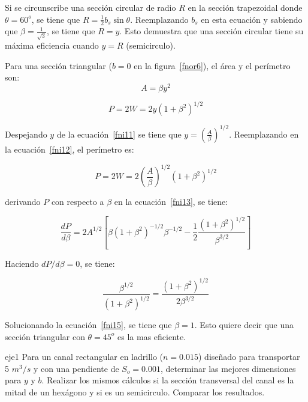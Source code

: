 \documentclass[11pt, oneside]{article}
\begin{document}
Si se circunscribe una secci\'on circular de radio $R$ en la secci\'on trapezoidal donde $\theta=60^o$, se tiene que $R=\frac{1}{2}b_s \sin \theta$. Reemplazando $b_s$ en esta ecuaci\'on y sabiendo que $\beta=\frac{1}{\sqrt{3}}$, se tiene que $R=y$. Esto demuestra que una secci\'on circular tiene su m\'axima eficiencia cuando $y=R$ (semicirculo). 

Para una secci\'on triangular ($b=0$ en la figura~\ref{fnor6}), el \'area y el per\'imetro son:
\begin{equation}
A = \beta y^2
\label{fni11}
\end{equation}

\begin{equation}
P = 2W =  2y \left( 1+\beta^2 \right)^{1/2}
\label{fni12}
\end{equation}

Despejando $y$ de la ecuaci\'on~\ref{fni11} se tiene que $y = \left( \frac{A}{\beta} \right)^{1/2}$. Reemplazando en la ecuaci\'on~\ref{fni12}, el per\'imetro es:

\begin{equation}
P = 2W =  2\left(\frac{A}{\beta}\right)^{1/2} \left( 1+\beta^2 \right)^{1/2}
\label{fni13}
\end{equation}

derivando $P$ con respecto a $\beta$ en la ecuaci\'on~\ref{fni13}, se tiene:

\begin{equation}
\frac{dP}{d\beta} =2A^{1/2}\left[ \beta \left( 1+\beta^2 \right)^{-1/2} \beta^{-1/2} - \frac{1}{2} \frac{\left( 1+\beta^2 \right)^{1/2}}{\beta^{3/2}} \right]
\label{fni14}
\end{equation}

Haciendo $dP/d\beta = 0$, se tiene:

\begin{equation}
\frac{\beta^{1/2}}{\left( 1+\beta^2 \right)^{1/2}} = \frac{\left( 1+\beta^2 \right)^{1/2}}{2 \beta^{3/2}}
\label{fni15}
\end{equation}

Solucionando la ecuaci\'on~\ref{fni15}, se tiene que $\beta=1$. Esto quiere decir que una secci\'on triangular con $\theta=45^o$ es la mas eficiente.

\begin{eje}{}{eje1}
Para un canal rectangular en ladrillo ($n=0.015$) dise\~nado para transportar 5 $m^3 /s$ y con una pendiente de $S_o = 0.001$, determinar las mejores dimensiones para $y$ y $b$. Realizar los mismos c\'alculos si la secci\'on transversal del canal es la mitad de un hex\'agono y si es un semicirculo. Comparar los resultados.  
\end{eje}
\end{document}
